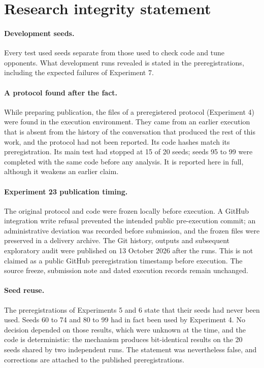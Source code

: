 \documentclass[11pt,a4paper]{article}
\begin{document}
\section{Research integrity statement}
\label{sec:integrity}

\paragraph{Development seeds.} Every test used seeds separate from those used to check code and tune opponents. What development runs revealed is stated in the preregistrations, including the expected failures of Experiment 7.

\paragraph{A protocol found after the fact.} While preparing publication, the files of a preregistered protocol (Experiment 4) were found in the execution environment. They came from an earlier execution that is absent from the history of the conversation that produced the rest of this work, and the protocol had not been reported. Its code hashes match its preregistration. Its main test had stopped at 15 of 20 seeds; seeds 95 to 99 were completed with the same code before any analysis. It is reported here in full, although it weakens an earlier claim.

\paragraph{Experiment 23 publication timing.} The original protocol and code were frozen locally before execution. A GitHub integration write refusal prevented the intended public pre-execution commit; an administrative deviation was recorded before submission, and the frozen files were preserved in a delivery archive. The Git history, outputs and subsequent exploratory audit were published on 13 October 2026 after the runs. This is not claimed as a public GitHub preregistration timestamp before execution. The source freeze, submission note and dated execution records remain unchanged.

\paragraph{Seed reuse.} The preregistrations of Experiments 5 and 6 state that their seeds had never been used. Seeds 60 to 74 and 80 to 99 had in fact been used by Experiment 4. No decision depended on those results, which were unknown at the time, and the code is deterministic: the mechanism produces bit-identical results on the 20 seeds shared by two independent runs. The statement was nevertheless false, and corrections are attached to the published preregistrations.
\end{document}
